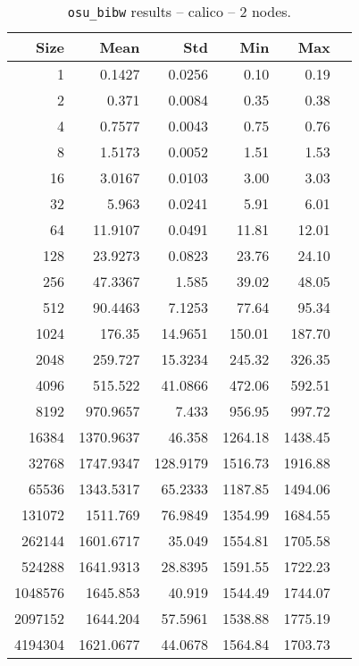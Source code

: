 \begin{table}[htbp]
\begin{minipage}{.48\textwidth}
  \label{tab:bibw-calico-1nodes}
  \end{minipage}
\hfill
\begin{minipage}{.48\textwidth}
    \centering
    \footnotesize
  \begin{tabular}{rrrrrr}
	\toprule
	\textbf{Size} & \textbf{Mean} & \textbf{Std} & \textbf{Min} & \textbf{Max}	\\
	\midrule
	1	&	0.1427   	&	0.0256	&	0.10	&	0.19	\\
	2	&	0.371   	&	0.0084	&	0.35	&	0.38	\\
	4	&	0.7577   	&	0.0043	&	0.75	&	0.76	\\
	8	&	1.5173   	&	0.0052	&	1.51	&	1.53	\\
	16	&	3.0167   	&	0.0103	&	3.00	&	3.03	\\
	32	&	5.963   	&	0.0241	&	5.91	&	6.01	\\
	64	&	11.9107   	&	0.0491	&	11.81	&	12.01	\\
	128	&	23.9273   	&	0.0823	&	23.76	&	24.10	\\
	256	&	47.3367   	&	1.585	&	39.02	&	48.05	\\
	512	&	90.4463   	&	7.1253	&	77.64	&	95.34	\\
	1024	&	176.35   	&	14.9651	&	150.01	&	187.70	\\
	2048	&	259.727   	&	15.3234	&	245.32	&	326.35	\\
	4096	&	515.522   	&	41.0866	&	472.06	&	592.51	\\
	8192	&	970.9657   	&	7.433	&	956.95	&	997.72	\\
	16384	&	1370.9637   	&	46.358	&	1264.18	&	1438.45	\\
	32768	&	1747.9347   	&	128.9179	&	1516.73	&	1916.88	\\
	65536	&	1343.5317   	&	65.2333	&	1187.85	&	1494.06	\\
	131072	&	1511.769   	&	76.9849	&	1354.99	&	1684.55	\\
	262144	&	1601.6717   	&	35.049	&	1554.81	&	1705.58	\\
	524288	&	1641.9313   	&	28.8395	&	1591.55	&	1722.23	\\
	1048576	&	1645.853   	&	40.919	&	1544.49	&	1744.07	\\
	2097152	&	1644.204   	&	57.5961	&	1538.88	&	1775.19	\\
	4194304	&	1621.0677   	&	44.0678	&	1564.84	&	1703.73	\\
	\bottomrule
	\end{tabular}
  \caption{\texttt{osu\_bibw} results -- calico -- 2 nodes.}
  \label{tab:bibw-calico-2nodes}
  \end{minipage}
\end{table}

